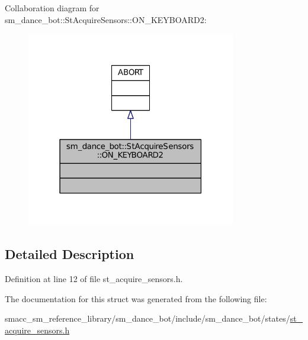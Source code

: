 Collaboration diagram for sm\+\_\+dance\+\_\+bot\+:\+:St\+Acquire\+Sensors\+:\+:O\+N\+\_\+\+K\+E\+Y\+B\+O\+A\+R\+D2\+:
\nopagebreak
\begin{figure}[H]
\begin{center}
\leavevmode
\includegraphics[width=259pt]{structsm__dance__bot_1_1StAcquireSensors_1_1ON__KEYBOARD2__coll__graph}
\end{center}
\end{figure}


\subsection{Detailed Description}


Definition at line 12 of file st\+\_\+acquire\+\_\+sensors.\+h.



The documentation for this struct was generated from the following file\+:\begin{DoxyCompactItemize}
\item 
smacc\+\_\+sm\+\_\+reference\+\_\+library/sm\+\_\+dance\+\_\+bot/include/sm\+\_\+dance\+\_\+bot/states/\hyperlink{st__acquire__sensors_8h}{st\+\_\+acquire\+\_\+sensors.\+h}\end{DoxyCompactItemize}
